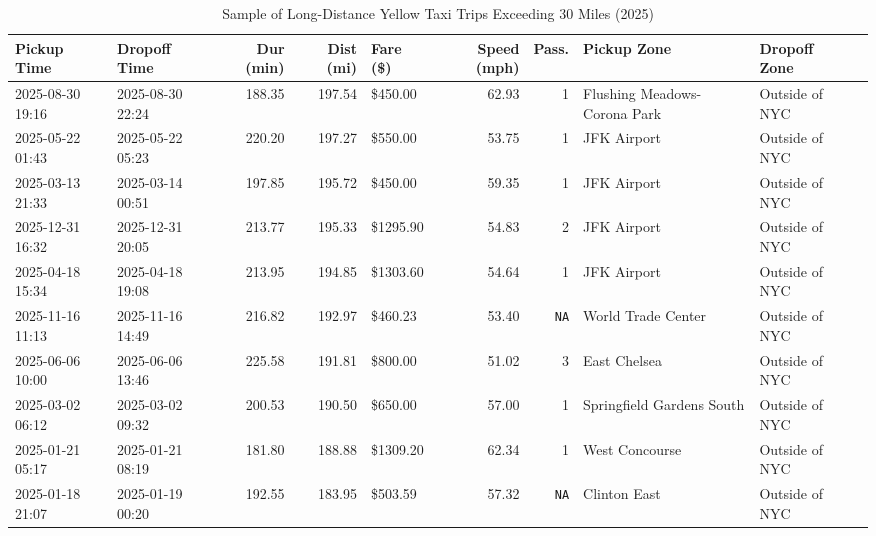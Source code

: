 \documentclass[11pt,a4paper]{article}
\begin{document}
\begin{table}[htbp]
\centering
\caption{Sample of Long-Distance Yellow Taxi Trips Exceeding 30 Miles (2025)}
\label{tab:long_distance_trips}
\tiny
\begin{tabularx}{\textwidth}{llrrlrrlXX}
\toprule
\textbf{Pickup Time} & \textbf{Dropoff Time} & \textbf{Dur (min)} & \textbf{Dist (mi)} & \textbf{Fare (\$)} & \textbf{Speed (mph)} & \textbf{Pass.} & \textbf{Pickup Zone} & \textbf{Dropoff Zone} \\
\midrule
2025-08-30 19:16 & 2025-08-30 22:24 & 188.35 & 197.54 & \$450.00 & 62.93 & 1 & Flushing Meadows-Corona Park & Outside of NYC \\
2025-05-22 01:43 & 2025-05-22 05:23 & 220.20 & 197.27 & \$550.00 & 53.75 & 1 & JFK Airport & Outside of NYC \\
2025-03-13 21:33 & 2025-03-14 00:51 & 197.85 & 195.72 & \$450.00 & 59.35 & 1 & JFK Airport & Outside of NYC \\
2025-12-31 16:32 & 2025-12-31 20:05 & 213.77 & 195.33 & \$1295.90 & 54.83 & 2 & JFK Airport & Outside of NYC \\
2025-04-18 15:34 & 2025-04-18 19:08 & 213.95 & 194.85 & \$1303.60 & 54.64 & 1 & JFK Airport & Outside of NYC \\
2025-11-16 11:13 & 2025-11-16 14:49 & 216.82 & 192.97 & \$460.23 & 53.40 & \texttt{NA} & World Trade Center & Outside of NYC \\
2025-06-06 10:00 & 2025-06-06 13:46 & 225.58 & 191.81 & \$800.00 & 51.02 & 3 & East Chelsea & Outside of NYC \\
2025-03-02 06:12 & 2025-03-02 09:32 & 200.53 & 190.50 & \$650.00 & 57.00 & 1 & Springfield Gardens South & Outside of NYC \\
2025-01-21 05:17 & 2025-01-21 08:19 & 181.80 & 188.88 & \$1309.20 & 62.34 & 1 & West Concourse & Outside of NYC \\
2025-01-18 21:07 & 2025-01-19 00:20 & 192.55 & 183.95 & \$503.59 & 57.32 & \texttt{NA} & Clinton East & Outside of NYC \\
\bottomrule
\end{tabularx}
\end{table}
\end{document}
